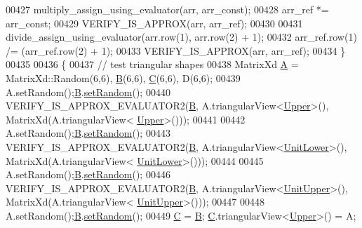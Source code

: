 \begin{DoxyCode}
00427     multiply\_assign\_using\_evaluator(arr, arr\_const);
00428     arr\_ref *= arr\_const;
00429     VERIFY\_IS\_APPROX(arr, arr\_ref);
00430 
00431     divide\_assign\_using\_evaluator(arr.row(1), arr.row(2) + 1);
00432     arr\_ref.row(1) /= (arr\_ref.row(2) + 1);
00433     VERIFY\_IS\_APPROX(arr, arr\_ref);
00434   \}
00435   
00436   \{
00437     \textcolor{comment}{// test triangular shapes}
00438     MatrixXd \hyperlink{group___core___module_class_eigen_1_1_matrix}{A} = MatrixXd::Random(6,6), \hyperlink{group___core___module_class_eigen_1_1_matrix}{B}(6,6), \hyperlink{group___core___module}{C}(6,6), D(6,6);
00439     A.setRandom();\hyperlink{group___core___module_class_eigen_1_1_matrix}{B}.\hyperlink{class_eigen_1_1_plain_object_base_af0e576a0e1aefc9ee346de44cc352ba3}{setRandom}();
00440     VERIFY\_IS\_APPROX\_EVALUATOR2(\hyperlink{group___core___module_class_eigen_1_1_matrix}{B}, A.triangularView<\hyperlink{group__enums_gga39e3366ff5554d731e7dc8bb642f83cda6bcb58be3b8b8ec84859ce0c5ac0aaec}{Upper}>(), MatrixXd(A.triangularView<
      \hyperlink{group__enums_gga39e3366ff5554d731e7dc8bb642f83cda6bcb58be3b8b8ec84859ce0c5ac0aaec}{Upper}>()));
00441     
00442     A.setRandom();\hyperlink{group___core___module_class_eigen_1_1_matrix}{B}.\hyperlink{class_eigen_1_1_plain_object_base_af0e576a0e1aefc9ee346de44cc352ba3}{setRandom}();
00443     VERIFY\_IS\_APPROX\_EVALUATOR2(\hyperlink{group___core___module_class_eigen_1_1_matrix}{B}, A.triangularView<\hyperlink{group__enums_gga39e3366ff5554d731e7dc8bb642f83cda8155cfdfde9e75e7144dff0393d17181}{UnitLower}>(), MatrixXd(A.triangularView<
      \hyperlink{group__enums_gga39e3366ff5554d731e7dc8bb642f83cda8155cfdfde9e75e7144dff0393d17181}{UnitLower}>()));
00444     
00445     A.setRandom();\hyperlink{group___core___module_class_eigen_1_1_matrix}{B}.\hyperlink{class_eigen_1_1_plain_object_base_af0e576a0e1aefc9ee346de44cc352ba3}{setRandom}();
00446     VERIFY\_IS\_APPROX\_EVALUATOR2(\hyperlink{group___core___module_class_eigen_1_1_matrix}{B}, A.triangularView<\hyperlink{group__enums_gga39e3366ff5554d731e7dc8bb642f83cda8b0b63ff46dcd7377b59df14e0562fc1}{UnitUpper}>(), MatrixXd(A.triangularView<
      \hyperlink{group__enums_gga39e3366ff5554d731e7dc8bb642f83cda8b0b63ff46dcd7377b59df14e0562fc1}{UnitUpper}>()));
00447     
00448     A.setRandom();\hyperlink{group___core___module_class_eigen_1_1_matrix}{B}.\hyperlink{class_eigen_1_1_plain_object_base_af0e576a0e1aefc9ee346de44cc352ba3}{setRandom}();
00449     \hyperlink{group___core___module}{C} = \hyperlink{group___core___module_class_eigen_1_1_matrix}{B}; \hyperlink{group___core___module}{C}.triangularView<\hyperlink{group__enums_gga39e3366ff5554d731e7dc8bb642f83cda6bcb58be3b8b8ec84859ce0c5ac0aaec}{Upper}>() = A;

\end{DoxyCode}
